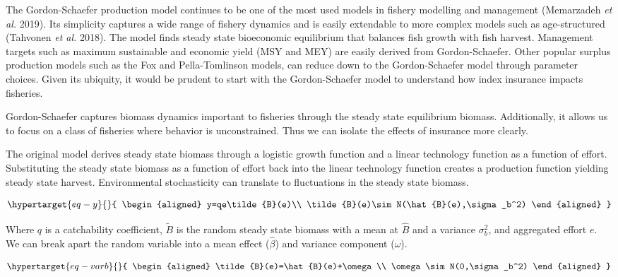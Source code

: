 \documentclass[
  letterpaper,
  DIV=11,
  numbers=noendperiod]{scrartcl}
\theoremstyle{plain}
\theoremstyle{plain}
\theoremstyle{remark}
\begin{document}
The Gordon-Schaefer production model continues to be one of the most
used models in fishery modelling and management (Memarzadeh \emph{et
al.} 2019). Its simplicity captures a wide range of fishery dynamics and
is easily extendable to more complex models such as age-structured
(Tahvonen \emph{et al.} 2018). The model finds steady state bioeconomic
equilibrium that balances fish growth with fish harvest. Management
targets such as maximum sustainable and economic yield (MSY and MEY) are
easily derived from Gordon-Schaefer. Other popular surplus production
models such as the Fox and Pella-Tomlinson models, can reduce down to
the Gordon-Schaefer model through parameter choices. Given its ubiquity,
it would be prudent to start with the Gordon-Schaefer model to
understand how index insurance impacts fisheries.

Gordon-Schaefer captures biomass dynamics important to fisheries through
the steady state equilibrium biomass. Additionally, it allows us to
focus on a class of fisheries where behavior is unconstrained. Thus we
can isolate the effects of insurance more clearly.

The original model derives steady state biomass through a logistic
growth function and a linear technology function as a function of
effort. Substituting the steady state biomass as a function of effort
back into the linear technology function creates a production function
yielding steady state harvest. Environmental stochasticity can translate
to fluctuations in the steady state biomass.

\begin{equation}\protect\hypertarget{eq-y}{}{
\begin{aligned}
y=qe\tilde{B}(e)\\
\tilde{B}(e)\sim N(\hat{B}(e),\sigma_b^2)
\end{aligned}
}\label{eq-y}\end{equation}

Where \(q\) is a catchability coefficient, \(\tilde{B}\) is the random
steady state biomass with a mean at \(\hat{B}\) and a variance
\(\sigma_b^2\), and aggregated effort \(e\). We can break apart the
random variable into a mean effect (\(\hat{\beta}\)) and variance
component (\(\omega\)).

\begin{equation}\protect\hypertarget{eq-varb}{}{
\begin{aligned}
\tilde{B}(e)=\hat{B}(e)+\omega \\
\omega\sim N(0,\sigma_b^2)
\end{aligned}
}\label{eq-varb}\end{equation}
\end{document}
